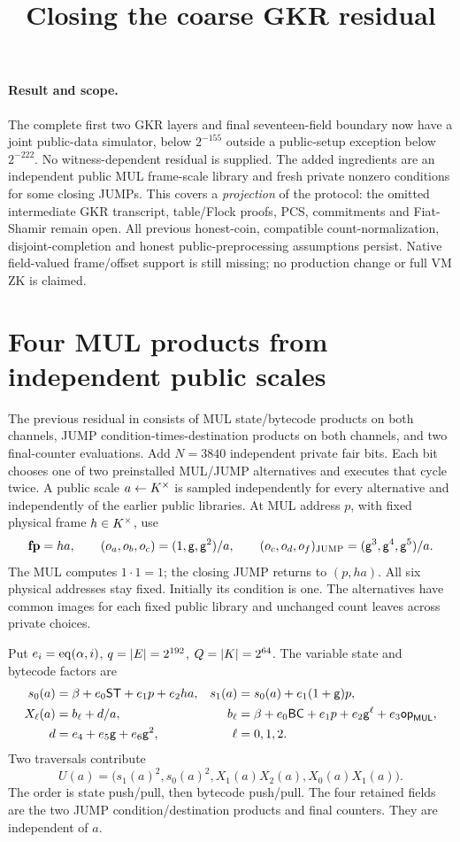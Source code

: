 \documentclass[11pt]{article}
\title{Closing the coarse GKR residual}
\author{}
\date{}
\begin{document}
\maketitle
\vspace{-2em}

\paragraph{Result and scope.} The complete first two GKR layers and final seventeen-field boundary now have a joint public-data simulator, below $2^{-155}$ outside a public-setup exception below $2^{-222}$. No witness-dependent residual is supplied. The added ingredients are an independent public MUL frame-scale library and fresh private nonzero conditions for some closing JUMPs. This covers a \emph{projection} of the protocol: the omitted intermediate GKR transcript, table/Flock proofs, PCS, commitments and Fiat-Shamir remain open. All previous honest-coin, compatible count-normalization, disjoint-completion and honest public-preprocessing assumptions persist. Native field-valued frame/offset support is still missing; no production change or full VM ZK is claimed.

\section{Four MUL products from independent public scales}

The previous residual in  consists of MUL state/bytecode products on both channels, JUMP condition-times-destination products on both channels, and two final-counter evaluations. Add $N=3840$ independent private fair bits. Each bit chooses one of two preinstalled MUL/JUMP alternatives and executes that cycle twice. A public scale $a\gets K^\times$ is sampled independently for every alternative and independently of the earlier public libraries. At MUL address $p$, with fixed physical frame $h\in K^\times$, use
\[
 \mathbf{fp}=ha,\qquad (o_a,o_b,o_c)=(1,\mathsf{g},\mathsf{g}^2)/a,
 \qquad (o_c,o_d,o_f)_{\rm JUMP}=(\mathsf{g}^3,\mathsf{g}^4,\mathsf{g}^5)/a.
\]
The MUL computes $1\cdot1=1$; the closing JUMP returns to $(p,ha)$. All six physical addresses stay fixed. Initially its condition is one. The alternatives have common images for each fixed public library and unchanged count leaves across private choices.

Put $e_i=\operatorname{eq}(\alpha,i)$, $q=|E|=2^{192}$, $Q=|K|=2^{64}$. The variable state and bytecode factors are
\[
\begin{aligned}
 s_0(a)&=\beta+e_0\mathsf{ST}+e_1p+e_2ha,&s_1(a)&=s_0(a)+e_1(1+\mathsf{g})p,\\
 X_\ell(a)&=b_\ell+d/a,&
 b_\ell&=\beta+e_0\mathsf{BC}+e_1p+e_2\mathsf{g}^\ell+e_3\mathsf{op}_{\mathsf{MUL}},\\
 d&=e_4+e_5\mathsf{g}+e_6\mathsf{g}^2,&\ell&=0,1,2.
\end{aligned}
\]
Two traversals contribute
\[
 U(a)=\bigl(s_1(a)^2,s_0(a)^2,X_1(a)X_2(a),X_0(a)X_1(a)\bigr).
\]
The order is state push/pull, then bytecode push/pull. The four retained fields are the two JUMP condition/destination products and final counters. They are independent of $a$.
\end{document}
